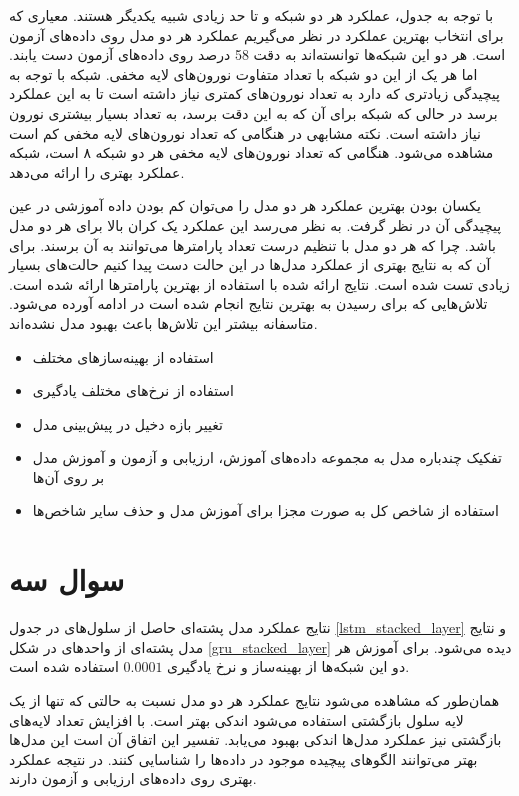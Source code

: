 \documentclass[12pt, a4paper]{book}
\begin{document}
با توجه به جدول، عملکرد هر دو شبکه  و  تا حد زیادی شبیه یکدیگر هستند. معیاری که برای انتخاب
بهترین عملکرد در نظر می‌گیریم عملکرد هر دو مدل روی داده‌های آزمون است. هر دو این شبکه‌ها توانسته‌اند به دقت
58 درصد روی داده‌های آزمون دست یابند. اما هر یک از این دو شبکه با تعداد متفاوت نورون‌های لایه مخفی. شبکه 
با توجه به پیچیدگی زیاد‌تری که دارد به تعداد نورون‌های کمتری نیاز داشته است تا به این عملکرد برسد در حالی که
شبکه  برای آن که به این دقت برسد، به تعداد بسیار بیشتری نورون نیاز داشته است. نکته مشابهی در هنگامی
که تعداد نورون‌های لایه مخفی کم است مشاهده می‌شود. هنگامی که تعداد نورون‌های لایه مخفی هر دو شبکه ۸ است، شبکه 
عملکرد بهتری را ارائه می‌دهد.

یکسان بودن بهترین عملکرد هر دو مدل را می‌توان کم بودن داده آموزشی در عین پیچیدگی آن در نظر گرفت.
به نظر می‌رسد این عملکرد یک کران بالا برای هر دو مدل باشد. چرا که هر دو مدل با تنظیم درست تعداد پارامتر‌ها
می‌توانند به آن برسند. برای آن که به نتایج بهتری از عملکرد مدل‌ها در این حالت دست پیدا کنیم حالت‌های
بسیار زیادی تست شده است. نتایج ارائه شده با استفاده از بهترین پارامتر‌ها ارائه شده است. تلاش‌هایی که
برای رسیدن به بهترین نتایج انجام شده است در ادامه آورده می‌شود. متاسفانه بیشتر این تلاش‌ها باعث بهبود مدل نشده‌اند.

\begin{itemize}
    \item استفاده از بهینه‌ساز‌های مختلف
    \item استفاده از نرخ‌های مختلف یادگیری
    \item تغییر بازه دخیل در پیش‌بینی مدل
    \item تفکیک چندباره مدل به مجموعه داده‌های آموزش، ارزیابی و آزمون و آموزش مدل بر روی آن‌ها
    \item استفاده از شاخص کل به صورت مجزا برای آموزش مدل و حذف سایر شاخص‌ها
\end{itemize}

\section*{سوال سه}

نتایج عملکرد مدل پشته‌ای حاصل از سلول‌های  در جدول \ref{lstm_stacked_layer} و نتایج مدل پشته‌ای از
واحد‌های  در شکل \ref{gru_stacked_layer} دیده می‌شود. برای آموزش هر دو این شبکه‌ها از بهینه‌ساز
 و نرخ یادگیری $0.0001$ استفاده شده است.

همان‌طور که مشاهده می‌شود نتایج عملکرد هر دو مدل نسبت به حالتی که تنها از یک لایه سلول بازگشتی استفاده می‌شود
اندکی بهتر است. با افزایش تعداد لایه‌های بازگشتی نیز عملکرد مدل‌ها اندکی بهبود می‌یابد. تفسیر این اتفاق آن است
این مدل‌ها بهتر می‌توانند الگوهای پیچیده موجود در داده‌ها را شناسایی کنند. در نتیجه عملکرد بهتری روی داده‌های
ارزیابی و آزمون دارند.
\end{document}
